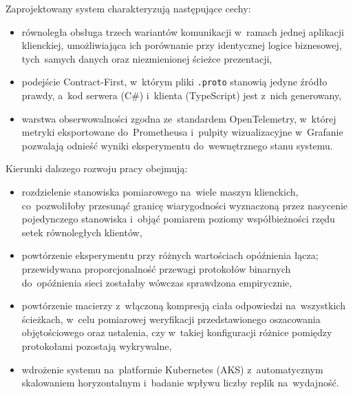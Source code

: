 Zaprojektowany system charakteryzują następujące cechy:

\begin{itemize}
\item równoległa obsługa trzech wariantów komunikacji w~ramach jednej aplikacji klienckiej, umożliwiająca ich porównanie przy identycznej logice biznesowej, tych~samych danych oraz niezmienionej ścieżce prezentacji,
\item podejście Contract-First, w~którym pliki \texttt{.proto} stanowią jedyne źródło prawdy, a~kod serwera (C\#) i~klienta (TypeScript) jest z~nich generowany,
\item warstwa obserwowalności zgodna ze~standardem OpenTelemetry, w~której metryki eksportowane do~Prometheusa i~pulpity wizualizacyjne w~Grafanie pozwalają odnieść wyniki eksperymentu do~wewnętrznego stanu systemu.
\end{itemize}

Kierunki dalszego rozwoju pracy obejmują:

\begin{itemize}
\item rozdzielenie stanowiska pomiarowego na~wiele maszyn klienckich, co~pozwoliłoby przesunąć granicę wiarygodności wyznaczoną przez nasycenie pojedynczego stanowiska i~objąć pomiarem poziomy współbieżności rzędu setek równoległych klientów,
\item powtórzenie eksperymentu przy różnych wartościach opóźnienia łącza; przewidywana proporcjonalność przewagi protokołów binarnych do~opóźnienia sieci zostałaby wówczas sprawdzona empirycznie,
\item powtórzenie macierzy z~włączoną kompresją ciała odpowiedzi na~wszystkich ścieżkach, w~celu pomiarowej weryfikacji przedstawionego oszacowania objętościowego oraz ustalenia, czy w~takiej konfiguracji różnice pomiędzy protokołami pozostają wykrywalne,
\item wdrożenie systemu na~platformie Kubernetes (AKS) z~automatycznym skalowaniem horyzontalnym i~badanie wpływu liczby replik na~wydajność.
\end{itemize}
